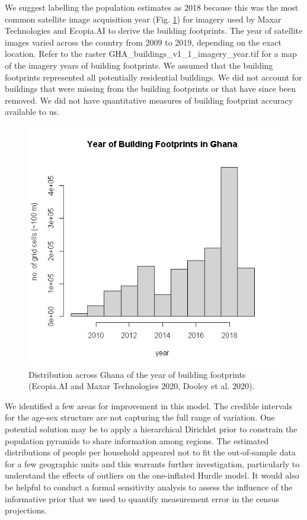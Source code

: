 \documentclass[]{book}
\begin{document}
We suggest labelling the population estimates as 2018 because this was
the most common satellite image acquisition year (Fig.
\ref{fig:imageryyear}) for imagery used by Maxar Technologies and
Ecopia.AI \citep{ecopia2020digitize} to derive the building footprints.
The year of satellite images varied across the country from 2009 to
2019, depending on the exact location. Refer to the raster
GHA\_buildings\_v1\_1\_imagery\_year.tif \citep{dooley2020gridded} for a
map of the imagery years of building footprints. We assumed that the
building footprints represented all potentially residential buildings.
We did not account for buildings that were missing from the building
footprints or that have since been removed. We did not have quantitative
measures of building footprint accuracy available to us.

\begin{figure}

{\centering \includegraphics[width=0.5\linewidth]{dat/GHAv1/foot_year} 

}

\caption{Distribution across Ghana of the year of building footprints (Ecopia.AI and Maxar Technologies 2020, Dooley et al. 2020).}\label{fig:imageryyear}
\end{figure}

We identified a few areas for improvement in this model. The credible
intervals for the age-sex structure are not capturing the full range of
variation. One potential solution may be to apply a hierarchical
Dirichlet prior to constrain the population pyramids to share
information among regions. The estimated distributions of people per
household appeared not to fit the out-of-sample data for a few
geographic units and this warrants further investigation, particularly
to understand the effects of outliers on the one-inflated Hurdle model.
It would also be helpful to conduct a formal sensitivity analysis to
assess the influence of the informative prior that we used to quantify
measurement error in the census projections.
\end{document}
